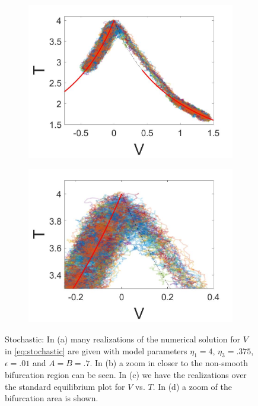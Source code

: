 \begin{figure}[H]
\begin{subfigure}{.5\textwidth}
 \includegraphics[width=\linewidth]{conclusion/stochastic_T.jpg}
 \caption{}
\end{subfigure}%
\begin{subfigure}{.5\textwidth}
 \centering
 \includegraphics[width=\linewidth]{conclusion/stochastic_T_zoom.jpg}
 \caption{}
\end{subfigure}
\caption{Stochastic: In (a) many realizations of the numerical solution for $V$ in \eqref{eq:stochastic} are given with model parameters $\eta_1=4$, $\eta_3=.375$, $\epsilon=.01$ and $A=B=.7$. In (b) a zoom in closer to the non-smooth bifurcation region can be seen. In (c) we have the realizations over the standard equilibrium plot for $V$ vs. $T$. In (d) a zoom of the bifurcation area is shown.}
\label{fig:stochastic}
\end{figure}